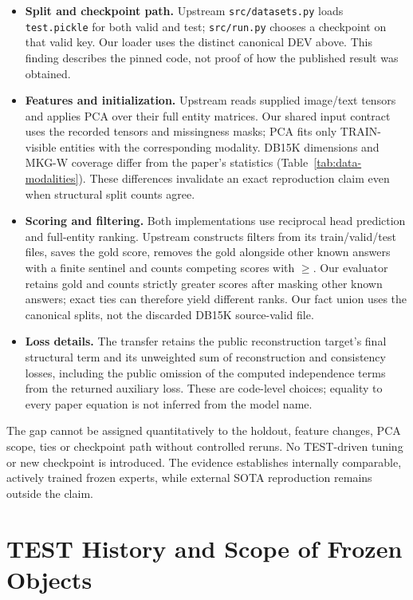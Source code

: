 \documentclass[11pt,a4paper]{article}
\begin{document}
\begin{itemize}
\item \textbf{Split and checkpoint path.} Upstream \texttt{src/datasets.py} loads \texttt{test.pickle} for both valid and test; \texttt{src/run.py} chooses a checkpoint on that valid key. Our loader uses the distinct canonical DEV above. This finding describes the pinned code, not proof of how the published result was obtained.
\item \textbf{Features and initialization.} Upstream reads supplied image/text tensors and applies PCA over their full entity matrices. Our shared input contract uses the recorded tensors and missingness masks; PCA fits only TRAIN-visible entities with the corresponding modality. DB15K dimensions and MKG-W coverage differ from the paper's statistics (Table~\ref{tab:data-modalities}). These differences invalidate an exact reproduction claim even when structural split counts agree.
\item \textbf{Scoring and filtering.} Both implementations use reciprocal head prediction and full-entity ranking. Upstream constructs filters from its train/valid/test files, saves the gold score, removes the gold alongside other known answers with a finite sentinel and counts competing scores with $\geq$. Our evaluator retains gold and counts strictly greater scores after masking other known answers; exact ties can therefore yield different ranks. Our fact union uses the canonical splits, not the discarded DB15K source-valid file.
\item \textbf{Loss details.} The transfer retains the public reconstruction target's final structural term and its unweighted sum of reconstruction and consistency losses, including the public omission of the computed independence terms from the returned auxiliary loss. These are code-level choices; equality to every paper equation is not inferred from the model name.
\end{itemize}
The gap cannot be assigned quantitatively to the holdout, feature changes, PCA scope, ties or checkpoint path without controlled reruns. No TEST-driven tuning or new checkpoint is introduced. The evidence establishes internally comparable, actively trained frozen experts, while external SOTA reproduction remains outside the claim.

\FloatBarrier
\section{TEST History and Scope of Frozen Objects}
\label{app:test-history}
\end{document}
